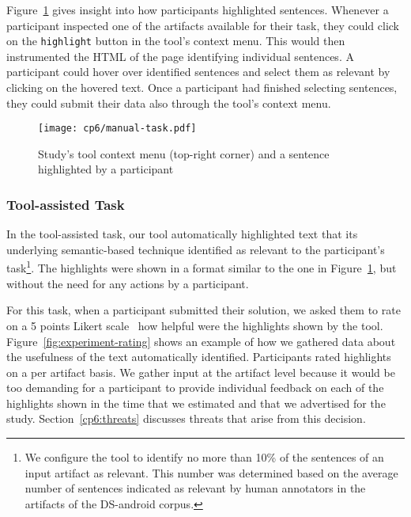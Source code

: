 Figure~\ref{fig:artifact-pre-highlight}
gives insight into how participants highlighted sentences. 
Whenever a participant inspected one of the artifacts available for their task, 
they could click on the \texttt{highlight} button in the tool's context menu.  
This would then instrumented the HTML of the page identifying individual sentences. 
A participant could hover over identified sentences and select them as relevant by clicking on the hovered text.
Once a participant had finished selecting sentences, they could submit 
their data also through the tool's context menu.





\begin{figure}
    \centering
    \texttt{[image: cp6/manual-task.pdf]}
    \caption{Study's tool context menu (top-right corner) and a sentence highlighted by a participant}
    \label{fig:artifact-pre-highlight}
\end{figure}




\subsubsection{Tool-assisted Task}
\label{cp6:procedures-tool-assisted}


In the tool-assisted task, our tool automatically highlighted text that 
its underlying semantic-based technique identified as relevant to the participant's task\footnote{
    We configure the tool to identify no more than 10\% of the sentences of an input artifact as relevant.
    This number was determined based on the average number of sentences indicated as relevant by human annotators in the artifacts of the \acs{DS-android} corpus.
}.
The highlights were shown in a format similar to the one in Figure~\ref{fig:artifact-pre-highlight}, but without the need for any actions by a participant.




For this task, when a participant submitted their solution, we asked them to 
rate on a 5 points Likert scale~\cite{likert1932technique} how helpful were the highlights shown by the tool.
Figure~\ref{fig:experiment-rating} shows an example of how we gathered data about the usefulness of the text automatically identified.
Participants rated highlights on a per artifact basis.
We gather input at the artifact level because it would be too demanding for a participant 
to provide individual feedback on each of the highlights shown
in the time that we estimated and that we advertised for the study.
Section~\ref{cp6:threats} discusses  threats that arise from this decision.




